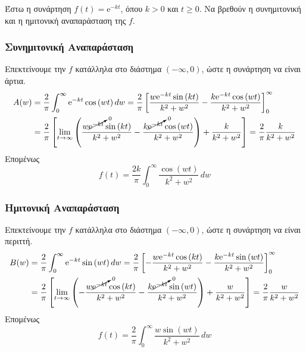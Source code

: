 \documentclass[a4paper,table]{report}
\begin{document}
\begin{example}
  Έστω η συνάρτηση $ f(t) = \mathrm{e}^{-kt} $, όπου $ k>0 $ και $ t \geq 0 $. 
  Να βρεθούν η συνημιτονική και η ημιτονική αναπαράσταση της $f$.
\end{example}
\begin{solution}
\item {}
  \subsubsection*{Συνημιτονική Αναπαράσταση}
  Επεκτείνουμε την $f$ κατάλληλα στο διάστημα $ (- \infty, 0) $, ώστε η συνάρτηση να
  είναι άρτια. 
  \begin{align*}
    A(w) &= \frac{2}{\pi} \int _{0}^{\infty} \mathrm{e}^{-kt} \cos{(wt)} \,{dw} = 
    \frac{2}{\pi} \left[\frac{w \mathrm{e}^{-kt} \sin{(kt)}}{k^{2}+w^{2}} - \frac{k
    \mathrm{e}^{-kt} \cos{(wt)}}{k^{2}+w^{2}}\right]_{0}^{\infty} \\
         &= \frac{2}{\pi} \left[\lim_{t \to \infty} \left(\frac{w
               \cancelto{0}{\mathrm{e}^{-kt}} \sin{(kt)}}{k^{2}+w^{2}} - \frac{k 
             \cancelto{0}{\mathrm{e}^{-kt}} \cos{(wt)}}{k^{2}+w^{2}} 
         \right)+ \frac{k}{k^{2}+w^{2}}\right] = \frac{2}{\pi} \frac{k}{k^{2}+w^{2}}
  \end{align*} 
  Επομένως 
  \[
    \boxed{f(t) = \frac{2k}{\pi} \int _{0}^{\infty} \frac{\cos{(wt)}}{k^{2}+w^{2}} 
    \,{dw}}
  \] 



  \subsubsection*{Ημιτονική Αναπαράσταση}
  Επεκτείνουμε την $f$ κατάλληλα στο διάστημα $ (- \infty, 0) $, ώστε η συνάρτηση να
  είναι περιττή. 
  \begin{align*}
    B(w) &= \frac{2}{\pi} \int _{0}^{\infty} \mathrm{e}^{-kt} \sin{(wt)} \,{dw} = 
    \frac{2}{\pi} \left[-\frac{w \mathrm{e}^{-kt} \cos{(kt)}}{k^{2}+w^{2}} - \frac{k
    \mathrm{e}^{-kt} \sin{(wt)}}{k^{2}+w^{2}}\right]_{0}^{\infty} \\
         &= \frac{2}{\pi} \left[\lim_{t \to \infty} \left(-\frac{w
               \cancelto{0}{\mathrm{e}^{-kt}} \cos{(kt)}}{k^{2}+w^{2}} - \frac{k 
             \cancelto{0}{\mathrm{e}^{-kt}} \sin{(wt)}}{k^{2}+w^{2}} 
         \right)+ \frac{w}{k^{2}+w^{2}}\right] = \frac{2}{\pi} \frac{w}{k^{2}+w^{2}}
  \end{align*} 
  Επομένως 
  \[
    \boxed{f(t) = \frac{2}{\pi} \int _{0}^{\infty} \frac{w\sin{(wt)}}{k^{2}+w^{2}} 
    \,{dw}}
  \] 
\end{solution}
\end{document}
